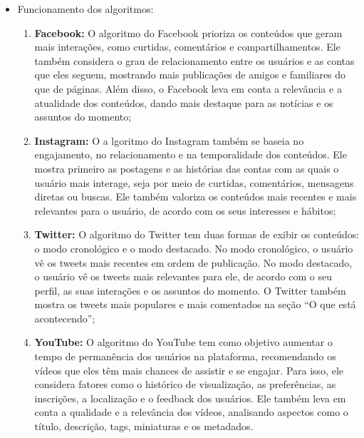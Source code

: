 \documentclass{article}%
\begin{document}
%
\newpage%
\begin{itemize}%
\item%
Funcionamento dos algoritmos:%
\begin{enumerate}[label=-]%
\item%
\textbf{Facebook:} O algoritmo do Facebook prioriza os conteúdos que geram mais interações, como curtidas, comentários e compartilhamentos. Ele também considera o grau de relacionamento entre os usuários e as contas que eles seguem, mostrando mais publicações de amigos e familiares do que de páginas. Além disso, o Facebook leva em conta a relevância e a atualidade dos conteúdos, dando mais destaque para as notícias e os assuntos do momento;%
\item%
\textbf{Instagram:} O a lgoritmo do Instagram também se baseia no engajamento, no relacionamento e na temporalidade dos conteúdos. Ele mostra primeiro as postagens e as histórias das contas com as quais o usuário mais interage, seja por meio de curtidas, comentários, mensagens diretas ou buscas. Ele também valoriza os conteúdos mais recentes e mais relevantes para o usuário, de acordo com os seus interesses e hábitos;%
\item%
\textbf{Twitter:} O algoritmo do Twitter tem duas formas de exibir os conteúdos: o modo cronológico e o modo destacado. No modo cronológico, o usuário vê os tweets mais recentes em ordem de publicação. No modo destacado, o usuário vê os tweets mais relevantes para ele, de acordo com o seu perfil, as suas interações e os assuntos do momento. O Twitter também mostra os tweets mais populares e mais comentados na seção “O que está acontecendo”;%
\item%
\textbf{YouTube:} O algoritmo do YouTube tem como objetivo aumentar o tempo de permanência dos usuários na plataforma, recomendando os vídeos que eles têm mais chances de assistir e se engajar. Para isso, ele considera fatores como o histórico de visualização, as preferências, as inscrições, a localização e o feedback dos usuários. Ele também leva em conta a qualidade e a relevância dos vídeos, analisando aspectos como o título, descrição, tags, miniaturas e os metadados.%
\end{enumerate}%
\end{itemize}%
\end{document}
